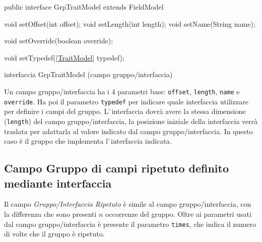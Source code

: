 \documentclass[a4paper,10pt]{report}
\newif\ifesource
\newenvironment{elisting}[1][!htb]
  {\captionsetup{aboveskip=0pt}\begin{listing}[#1]}
  {\end{listing}%
}
\begin{document}
\ifesource
\begin{figure*}[!htb]
\begin{lstlisting}[language=java, 
caption=interfaccia GrpTraitModel (campo gruppo/interfaccia), 
label=lst:GrpTraitModel]
public interface GrpTraitModel extends FieldModel {
    void setOffset(int offset);
    void setLength(int length);
    void setName(String name);
    
    void setOverride(boolean override);
    
    void setTypedef((*\hyperref[lst:TraitModel]{TraitModel}*) typedef);
}
\end{lstlisting}\index{GrpTraitModel}
\end{figure*}
\else
\begin{elisting}
\begin{javacode}
public interface GrpTraitModel extends FieldModel {
    void setOffset(int offset);
    void setLength(int length);
    void setName(String name);
    
    void setOverride(boolean override);
    
    void setTypedef(|\hyperref[lst:TraitModel]{TraitModel}| typedef);
}
\end{javacode}
\caption{interfaccia GrpTraitModel (campo gruppo/interfaccia)}
\label{lst:GrpTraitModel}
\end{elisting}
\fi

Un campo gruppo/interfaccia ha i 4 parametri base: \verb!offset!, \verb!length!, 
\verb!name! e \verb!override!.
Ha poi il parametro \verb!typedef! per indicare quale interfaccia utilizzare per
definire i campi del gruppo. L'\,interfaccia dovrà avere la stessa dimensione 
(\verb!length!) del campo gruppo/interfaccia, la posizione iniziale della 
interfaccia verrà traslata per adattarla al valore indicato dal campo 
gruppo/interfaccia.
In questo caso è il gruppo che implementa l'\,interfaccia indicata.


\subsection{Campo Gruppo di campi ripetuto definito mediante interfaccia}
Il campo \textsl{Gruppo/Interfaccia Ripetuto} è simile al campo 
gruppo/interfaccia, con la differenza che sono presenti $n$ occorrenze del 
gruppo. Oltre ai parametri usati dal campo gruppo/interfaccia è presente il 
parametro \verb!times!, che indica il numero di volte che il gruppo è ripetuto.
\end{document}
